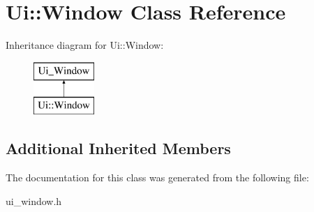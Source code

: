 \hypertarget{class_ui_1_1_window}{}\section{Ui\+:\+:Window Class Reference}
\label{class_ui_1_1_window}
Inheritance diagram for Ui\+:\+:Window\+:\begin{figure}[H]
\begin{center}
\leavevmode
\includegraphics[height=2.000000cm]{class_ui_1_1_window}
\end{center}
\end{figure}
\subsection*{Additional Inherited Members}


The documentation for this class was generated from the following file\+:\begin{DoxyCompactItemize}
\item 
ui\+\_\+window.\+h\end{DoxyCompactItemize}
